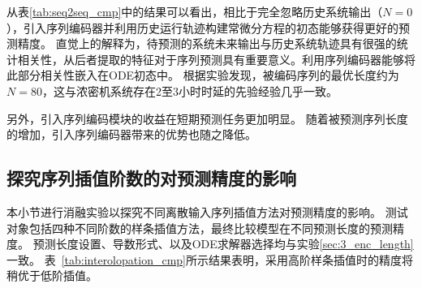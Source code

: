 从表\ref{tab:seq2seq_cmp}中的结果可以看出，相比于完全忽略历史系统输出（$N=0$），引入序列编码器并利用历史运行轨迹构建常微分方程的初态能够获得更好的预测精度。
直觉上的解释为，待预测的系统未来输出与历史系统轨迹具有很强的统计相关性，从后者提取的特征对于序列预测具有重要意义。利用序列编码器能够将此部分相关性嵌入在ODE初态中。
根据实验发现，被编码序列的最优长度约为$N=80$，这与浓密机系统存在2至3小时时延的先验经验几乎一致。

另外，引入序列编码模块的收益在短期预测任务更加明显。
随着被预测序列长度的增加，引入序列编码器带来的优势也随之降低。

\subsection{探究序列插值阶数的对预测精度的影响}
本小节进行消融实验以探究不同离散输入序列插值方法对预测精度的影响。
测试对象包括四种不同阶数的样条插值方法，最终比较模型在不同预测长度的预测精度。
预测长度设置、导数形式、以及ODE求解器选择均与实验\ref{sec:3_enc_length}一致。
表~\ref{tab:interolopation_cmp}所示结果表明，采用高阶样条插值时的精度将稍优于低阶插值。

